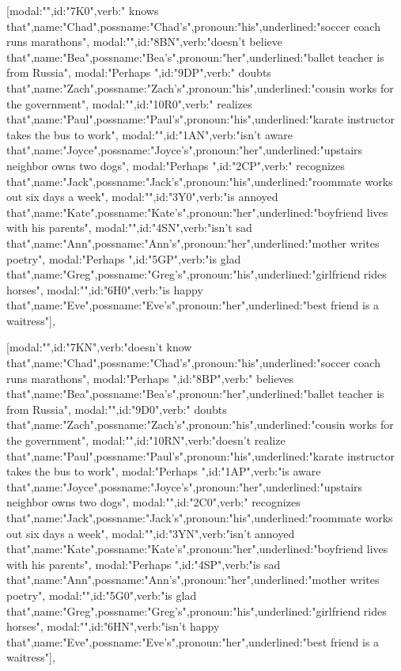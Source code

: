 [{modal:"",id:"7K0",verb:" knows that",name:"Chad",possname:"Chad's",pronoun:"his",underlined:"soccer coach runs marathons"},
{modal:"",id:"8BN",verb:"doesn't believe that",name:"Bea",possname:"Bea's",pronoun:"her",underlined:"ballet teacher is from Russia"},
{modal:"Perhaps ",id:"9DP",verb:" doubts that",name:"Zach",possname:"Zach's",pronoun:"his",underlined:"cousin works for the government"},
{modal:"",id:"10R0",verb:" realizes that",name:"Paul",possname:"Paul's",pronoun:"his",underlined:"karate instructor takes the bus to work"},
{modal:"",id:"1AN",verb:"isn't aware that",name:"Joyce",possname:"Joyce's",pronoun:"her",underlined:"upstairs neighbor owns two dogs"},
{modal:"Perhaps ",id:"2CP",verb:" recognizes that",name:"Jack",possname:"Jack's",pronoun:"his",underlined:"roommate works out six days a week"},
{modal:"",id:"3Y0",verb:"is annoyed that",name:"Kate",possname:"Kate's",pronoun:"her",underlined:"boyfriend lives with his parents"},
{modal:"",id:"4SN",verb:"isn't sad that",name:"Ann",possname:"Ann's",pronoun:"her",underlined:"mother writes poetry"},
{modal:"Perhaps ",id:"5GP",verb:"is glad that",name:"Greg",possname:"Greg's",pronoun:"his",underlined:"girlfriend rides horses"},
{modal:"",id:"6H0",verb:"is happy that",name:"Eve",possname:"Eve's",pronoun:"her",underlined:"best friend is a waitress"}],

[{modal:"",id:"7KN",verb:"doesn't know that",name:"Chad",possname:"Chad's",pronoun:"his",underlined:"soccer coach runs marathons"},
{modal:"Perhaps ",id:"8BP",verb:" believes that",name:"Bea",possname:"Bea's",pronoun:"her",underlined:"ballet teacher is from Russia"},
{modal:"",id:"9D0",verb:" doubts that",name:"Zach",possname:"Zach's",pronoun:"his",underlined:"cousin works for the government"},
{modal:"",id:"10RN",verb:"doesn't realize that",name:"Paul",possname:"Paul's",pronoun:"his",underlined:"karate instructor takes the bus to work"},
{modal:"Perhaps ",id:"1AP",verb:"is aware that",name:"Joyce",possname:"Joyce's",pronoun:"her",underlined:"upstairs neighbor owns two dogs"},
{modal:"",id:"2C0",verb:" recognizes that",name:"Jack",possname:"Jack's",pronoun:"his",underlined:"roommate works out six days a week"},
{modal:"",id:"3YN",verb:"isn't annoyed that",name:"Kate",possname:"Kate's",pronoun:"her",underlined:"boyfriend lives with his parents"},
{modal:"Perhaps ",id:"4SP",verb:"is sad that",name:"Ann",possname:"Ann's",pronoun:"her",underlined:"mother writes poetry"},
{modal:"",id:"5G0",verb:"is glad that",name:"Greg",possname:"Greg's",pronoun:"his",underlined:"girlfriend rides horses"},
{modal:"",id:"6HN",verb:"isn't happy that",name:"Eve",possname:"Eve's",pronoun:"her",underlined:"best friend is a waitress"}],

